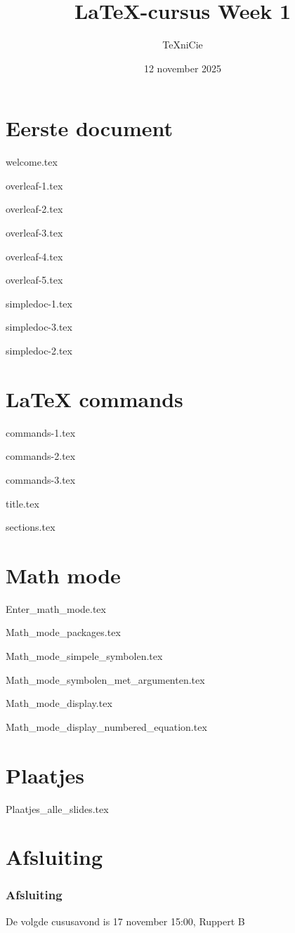 \documentclass[allauthors,dutch]{../../cursuspresentatie}
\title{\LaTeX{}-cursus Week 1}
\author{\TeX niCie}
\date{12 november 2025}
\def\importslidei#1#2{%
	{#2}
}
\def\importslideh#1#2{%
	{#2}
}
\begin{document}
\section{Eerste document}
\def\placetarget{\hypertarget{eerste_document}{}}

\importslideh{beginners_NL}{welcome.tex}
\importslideh{beginners_NL}{overleaf-1.tex}
\importslideh{beginners_NL}{overleaf-2.tex}
\importslideh{beginners_NL}{overleaf-3.tex}
\importslideh{beginners_NL}{overleaf-4.tex}
\importslideh{beginners_NL}{overleaf-5.tex}

\importslideh{beginners_NL}{simpledoc-1.tex}
\importslideh{beginners_NL}{simpledoc-3.tex}
\importslideh{beginners_NL}{simpledoc-2.tex}

\section{LaTeX commands}
\def\placetarget{\hypertarget{commands}{}}

\importslideh{beginners_NL}{commands-1.tex}
\importslideh{beginners_NL}{commands-2.tex}
\importslideh{beginners_NL}{commands-3.tex}

\importslideh{beginners_NL}{title.tex}

\importslideh{beginners_NL}{sections.tex}

\section{Math mode}
\def\placetarget{\hypertarget{math_mode}{}}

\importslidei{2025-eerstejaars_cursus_1}{Enter_math_mode.tex}
\importslidei{2025-eerstejaars_cursus_1}{Math_mode_packages.tex}
\importslidei{2025-eerstejaars_cursus_1}{Math_mode_simpele_symbolen.tex}
\importslidei{2025-eerstejaars_cursus_1}{Math_mode_symbolen_met_argumenten.tex}
\importslidei{2025-eerstejaars_cursus_1}{Math_mode_display.tex}
\importslidei{2025-eerstejaars_cursus_1}{Math_mode_display_numbered_equation.tex}

\section{Plaatjes}
\def\placetarget{\hypertarget{plaatjes}{}}

\importslidei{2025-eerstejaars_cursus_1}{Plaatjes_alle_slides.tex}

\section{Afsluiting}
\begin{frame}
	\frametitle{Afsluiting}
	
	De volgde cususavond is 17 november 15:00, Ruppert B
\end{frame}
	
\end{document}
